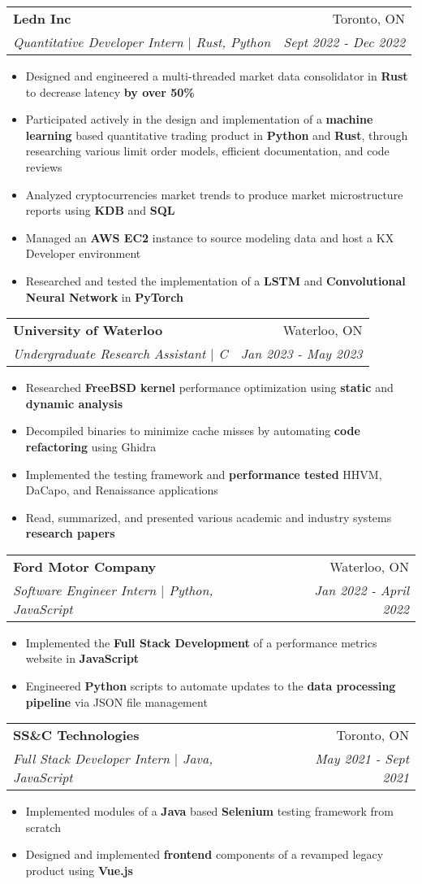 \documentclass[letterpaper,11pt]{article}
\makeatletter
\newcommand{\resumeItem}[1]{
  \item\small{
    {#1 \vspace{-2pt}}
  }
}
\newcommand{\resumeSubheading}[4]{
  \vspace{-2pt}\item
    \begin{tabular*}{0.97\textwidth}[t]{l@{\extracolsep{\fill}}r}
      \textbf{#1} & #2 \\
      \textit{\small#3} & \textit{\small #4} \\
    \end{tabular*}\vspace{-7pt}
}
\newcommand{\resumeItemListStart}{\begin{itemize}}
\newcommand{\resumeItemListEnd}{\end{itemize}\vspace{-5pt}}
\makeatother
\begin{document}
  \resumeSubheading
      {Ledn Inc}{Toronto, ON}
      {Quantitative Developer Intern $|$ Rust, Python}{Sept 2022 - Dec 2022}
      \resumeItemListStart
      \resumeItem{ Designed and engineered a multi-threaded market data consolidator in \textbf{Rust} to decrease latency \textbf{by over 50\% }}
      \resumeItem{ Participated actively in the design and implementation of a\textbf{ machine learning }based quantitative trading product in \textbf{Python} and \textbf{Rust}, through researching various limit order models, efficient documentation, and code reviews }
      \resumeItem{ Analyzed cryptocurrencies market trends to produce market microstructure reports using \textbf{KDB} and \textbf{SQL}}
      \resumeItem{ Managed an \textbf{AWS EC2} instance to source modeling data and host a KX Developer environment}
      \resumeItem{ Researched and tested the implementation of a \textbf{LSTM} and \textbf{Convolutional Neural Network} in \textbf{PyTorch}}
        \resumeItemListEnd

    \resumeSubheading
      {University of Waterloo}{Waterloo, ON}
      {Undergraduate Research Assistant $|$ C}{Jan 2023 - May 2023}
      \resumeItemListStart
      \resumeItem{Researched \textbf{FreeBSD kernel} performance optimization using \textbf{static} and \textbf{dynamic analysis }}
      \resumeItem{Decompiled binaries to minimize cache misses by automating \textbf{code refactoring }using Ghidra}
      \resumeItem{Implemented the testing framework and \textbf{performance tested} HHVM, DaCapo, and Renaissance applications}
      \resumeItem{Read, summarized, and presented various academic and industry systems \textbf{research papers}}
      \resumeItemListEnd
      

      \resumeSubheading
      {Ford Motor Company}{Waterloo, ON}
      {Software Engineer Intern $|$ Python, JavaScript}{Jan 2022 - April 2022}
      \resumeItemListStart
      \resumeItem{Implemented the \textbf{Full Stack Development} of a performance metrics website in \textbf{JavaScript}}
      \resumeItem{Engineered \textbf{Python} scripts to automate updates to the \textbf{data processing pipeline} via JSON file management}

      \resumeItemListEnd

      \resumeSubheading
      {SS\&C Technologies}{Toronto, ON}
      {Full Stack Developer Intern $|$ Java, JavaScript} {May 2021 - Sept 2021}
      \resumeItemListStart
      \resumeItem{Implemented modules of a \textbf{Java} based \textbf{Selenium} testing framework from scratch }
      \resumeItem{Designed and implemented \textbf{frontend }components of a revamped legacy product using \textbf{Vue.js }}
      \resumeItemListEnd
\end{document}
